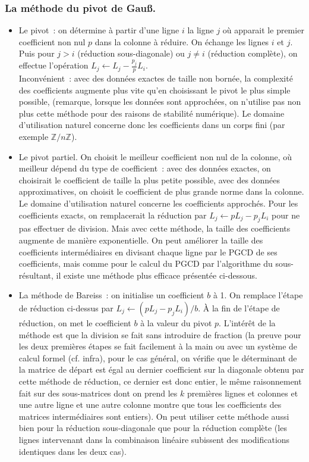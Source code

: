 \documentclass[a4paper,11pt]{article}
\newcommand{\Z}{{\mathbb{Z}}}
\begin{document}
\subsubsection{La m\'ethode du pivot de Gau\ss.} 
\begin{itemize}
\item Le pivot~: on détermine à partir d'une ligne $i$ 
la ligne $j$ où apparait le premier coefficient non nul $p$ dans
la colonne à réduire. On échange les lignes
$i$ et $j$. Puis pour $j>i$ (réduction sous-diagonale)
ou $j\neq i$ (réduction complète), on effectue l'opération
$L_j \leftarrow L_j - \frac{p_j}{p}L_i$.\\
Inconv\'enient~: avec des donn\'ees exactes de taille non born\'ee, 
la complexité des coefficients augmente plus vite qu'en choisissant 
le pivot le plus simple possible, (remarque, lorsque les donn\'ees 
sont approch\'ees, on n'utilise pas non plus cette méthode
pour des raisons de stabilit\'e num\'erique).
Le domaine d'utilisation naturel concerne donc les coefficients
dans un corps fini (par exemple $\Z/n\Z$).
\item Le pivot partiel. On choisit le meilleur coefficient non nul de la
colonne, où meilleur dépend du type de coefficient~: avec des données
exactes, on choisirait le coefficient de taille la plus petite possible,
avec des donn\'ees approximatives, on choisit
le coefficient de plus grande norme dans la colonne.
Le domaine d'utilisation naturel concerne les coefficients
approch\'es. Pour les coefficients exacts, on remplacerait la
réduction par $L_j \leftarrow pL_j -p_j L_i$ pour ne pas effectuer
de division. Mais avec cette méthode, la taille des coefficients
augmente de manière exponentielle. On peut améliorer
la taille des coefficients intermédiaires en divisant chaque
ligne par le PGCD de ses coefficients, mais comme pour le
calcul du PGCD par l'algorithme du sous-résultant, il existe
une méthode plus efficace présentée ci-dessous.
\item La m\'ethode de Bareiss~: on initialise un coefficient $b$ \`a 1.
On remplace l'\'etape de r\'eduction ci-dessus
par $L_j \leftarrow (pL_j -p_j L_i)/b$.
\`A la fin de l'\'etape de r\'eduction, on met le coefficient $b$
\`a la valeur du pivot $p$. L'intérêt de la méthode est que la division
se fait sans introduire de fraction (la preuve pour les deux premi\`eres
\'etapes se fait facilement \`a la main ou avec
un système de calcul formel (cf. infra), pour le cas g\'en\'eral, on v\'erifie
que le d\'eterminant de la matrice de d\'epart
est \'egal au dernier coefficient sur la diagonale obtenu par
cette m\'ethode de r\'eduction, ce dernier est donc entier, le
m\^eme raisonnement fait sur des sous-matrices dont on prend les
$k$ premi\`eres lignes et colonnes et une autre ligne et une autre
colonne montre que tous les coefficients des matrices interm\'ediaires
sont entiers).
On peut utiliser cette méthode aussi bien pour la réduction
sous-diagonale que pour la réduction complète (les lignes
intervenant dans la combinaison linéaire subissent des 
modifications identiques dans les deux cas).
\end{itemize}
\end{document}
